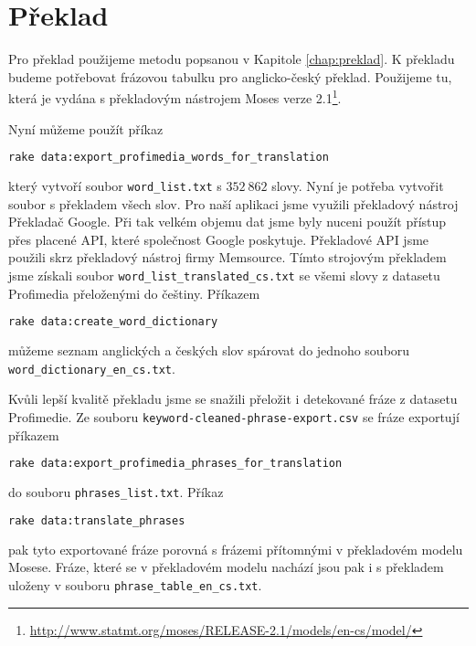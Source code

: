 \section{Překlad}
\label{subsec:zprovozneni_preklad}

Pro překlad použijeme metodu popsanou v Kapitole \ref{chap:preklad}. K překladu budeme potřebovat frázovou tabulku pro anglicko-český překlad. Použijeme tu, která je vydána s překladovým nástrojem Moses verze 2.1\footnote{\url{http://www.statmt.org/moses/RELEASE-2.1/models/en-cs/model/}}.

Nyní můžeme použít příkaz

\begin{lstlisting}[language=bash]
rake data:export_profimedia_words_for_translation
\end{lstlisting}

který vytvoří soubor \lstinline{word_list.txt} s $352\ 862$ slovy. Nyní je potřeba vytvořit soubor s překladem všech slov. Pro naší aplikaci jsme využili překladový nástroj Překladač Google. Při tak velkém objemu dat jsme byly nuceni použít přístup přes placené API, které společnost Google poskytuje. Překladové API jsme použili skrz překladový nástroj firmy Memsource. Tímto strojovým překladem jsme získali soubor \lstinline{word_list_translated_cs.txt} se všemi slovy z datasetu Profimedia přeloženými do češtiny. Příkazem

\begin{lstlisting}[language=bash]
rake data:create_word_dictionary
\end{lstlisting}

můžeme seznam anglických a českých slov spárovat do jednoho souboru \lstinline{word_dictionary_en_cs.txt}.

Kvůli lepší kvalitě překladu jsme se snažili přeložit i detekované fráze z datasetu Profimedie. Ze souboru \lstinline{keyword-cleaned-phrase-export.csv} se fráze exportují příkazem

\begin{lstlisting}[language=bash]
rake data:export_profimedia_phrases_for_translation
\end{lstlisting}

do souboru \lstinline{phrases_list.txt}. Příkaz

\begin{lstlisting}[language=bash]
rake data:translate_phrases
\end{lstlisting}

pak tyto exportované fráze porovná s frázemi přítomnými v překladovém modelu Mosese. Fráze, které se v překladovém modelu nachází jsou pak i s překladem uloženy v souboru \lstinline{phrase_table_en_cs.txt}.

